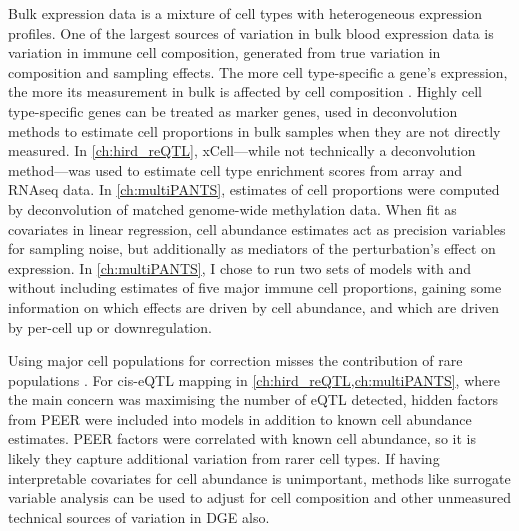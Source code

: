 Bulk expression data is a mixture of cell types with heterogeneous expression profiles.
One of the largest sources of variation in bulk blood expression data is variation in immune cell composition, generated from true variation in composition and sampling effects.
The more cell type-specific a gene's expression, the more its measurement in bulk is affected by cell composition \autocite{farahbod2020UntanglingEffectsCellular}.
Highly cell type-specific genes can be treated as marker genes, 
used in deconvolution methods to estimate cell proportions in bulk samples when they are not directly measured.
In \cref{ch:hird_reQTL}, xCell---while not technically a deconvolution method---was used to estimate cell type enrichment scores from array and \gls{RNAseq} data.
In \cref{ch:multiPANTS}, estimates of cell proportions were computed by deconvolution of matched genome-wide methylation data.
When fit as covariates in linear regression, 
cell abundance estimates act as precision variables for sampling noise, 
but additionally as mediators of the perturbation's effect on expression.
In \cref{ch:multiPANTS}, I chose to run two sets of models with and without including estimates of five major immune cell proportions,
gaining some information on which effects are driven by cell abundance, and which are driven by per-cell up or downregulation.

Using major cell populations for correction misses the contribution of rare populations \autocite{pellegrinocoppola2020CorrectionBothCommon}.
For cis-\gls{eQTL} mapping in \cref{ch:hird_reQTL,ch:multiPANTS}, where the main concern was maximising the number of \gls{eQTL} detected,
hidden factors from PEER were included into models in addition to known cell abundance estimates.
PEER factors were correlated with known cell abundance, so it is likely they capture additional variation from rarer cell types.
If having interpretable covariates for cell abundance is unimportant,
methods like surrogate variable analysis \autocite{leek2014SvaseqRemovingBatch,liu2016EvaluationMethodsRemoving}
can be used to adjust for cell composition and other unmeasured technical sources of variation in \gls{DGE} also.

